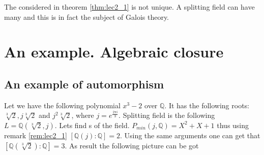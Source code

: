 \begin{remark}
  The  considered in theorem \ref{thm:lec2_1}
  is not unique. A splitting field  can 
  have many  and this is in fact the subject
  of Galois theory.
\end{remark}

\section{An example. Algebraic closure}

\subsection{An example of automorphism}

\begin{example}
  Let we have the following polynomial $x^3-2$ over $\mathbb{Q}$. It
  has the following roots: $\sqrt[3]{2}, j\sqrt[3]{2}$ and
  $j^2\sqrt[3]{2}$, where $j = e^{\frac{2 \pi i}{3}}$. Splitting field
  is the following $L = \mathbb{Q}\left(\sqrt[3]{2}, j\right)$. Lets
  find s of the field.
  $P_{min}\left(j, \mathbb{Q}\right) = X^2 + X + 1$ thus using remark
  \ref{rem:lec2_1} 
  $\left[\mathbb{Q}\left(j\right) : \mathbb{Q}\right] = 2$.
  Using the same arguments one can get that
  $\left[\mathbb{Q}\left(\sqrt[3]{2}\right) : \mathbb{Q}\right] = 3$.
  As result the following picture can be got
  


\end{example}

